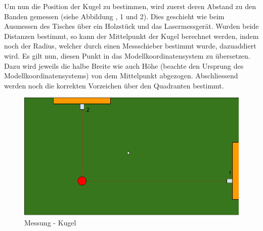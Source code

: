 Um nun die Position der Kugel zu bestimmen, wird zuerst deren Abstand zu den Banden gemessen (siehe Abbildung \label{fig:messung:kugel}, 1 und 2).
Dies geschieht wie beim Ausmessen des Tisches über ein Holzstück und das Lasermessgerät. Wurden beide Distanzen bestimmt, so
kann der Mittelpunkt der Kugel berechnet werden, indem noch der Radius, welcher durch einen Messschieber bestimmt wurde, dazuaddiert wird.
Es gilt nun, diesen Punkt in das Modellkoordinatensystem zu übersetzen. Dazu wird jeweils die halbe Breite wie auch Höhe
(beachte den Ursprung des Modellkoordinatensystems) von dem Mittelpunkt abgezogen. Abschliessend werden noch die korrekten
Vorzeichen über den Quadranten bestimmt.

\begin{figure}[h!]
    \begin{center}
        \includegraphics[width=0.6\linewidth]{../common/03_billiard_ai/resources/02_messung_kugel.png}
    \end{center}
    \caption{Messung - Kugel}
    \label{fig:messung:kugel}
\end{figure}
